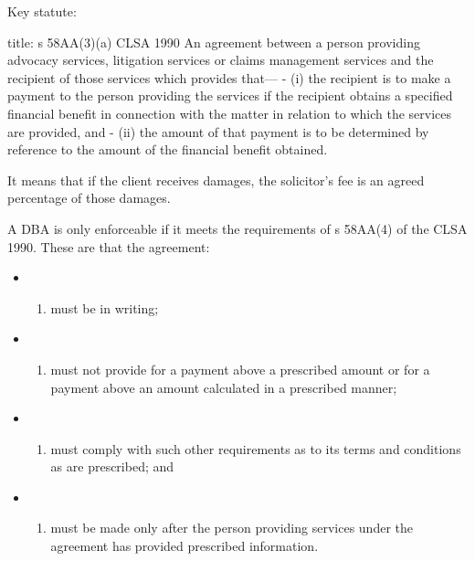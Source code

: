 \documentclass[
]{article}
\newenvironment{Shaded}{}{}
\newcommand{\NormalTok}[1]{#1}
\providecommand{\tightlist}{%
  \setlength{\itemsep}{0pt}\setlength{\parskip}{0pt}}
\begin{document}
Key statute:

\begin{Shaded}
\begin{Highlighting}[]
\NormalTok{title: s 58AA(3)(a) CLSA 1990}
\NormalTok{An agreement between a person providing advocacy services, litigation services or claims management services and the recipient of those services which provides that—}
\NormalTok{{-} (i) the recipient is to make a payment to the person providing the services if the recipient obtains a specified financial benefit in connection with the matter in relation to which the services are provided, and}
\NormalTok{{-} (ii) the amount of that payment is to be determined by reference to the amount of the financial benefit obtained.}
\end{Highlighting}
\end{Shaded}

It means that if the client receives damages, the solicitor's fee is an
agreed percentage of those damages.

A DBA is only enforceable if it meets the requirements of s 58AA(4) of
the CLSA 1990. These are that the agreement:

\begin{itemize}
\item
  \begin{enumerate}
  \def\labelenumi{(\alph{enumi})}
  \tightlist
  \item
    must be in writing;
  \end{enumerate}
\item
  \begin{enumerate}
  \def\labelenumi{(\alph{enumi})}
  \setcounter{enumi}{1}
  \tightlist
  \item
    must not provide for a payment above a prescribed amount or for a
    payment above an amount calculated in a prescribed manner;
  \end{enumerate}
\item
  \begin{enumerate}
  \def\labelenumi{(\alph{enumi})}
  \setcounter{enumi}{2}
  \tightlist
  \item
    must comply with such other requirements as to its terms and
    conditions as are prescribed; and
  \end{enumerate}
\item
  \begin{enumerate}
  \def\labelenumi{(\alph{enumi})}
  \setcounter{enumi}{3}
  \tightlist
  \item
    must be made only after the person providing services under the
    agreement has provided prescribed information.
  \end{enumerate}
\end{itemize}
\end{document}
